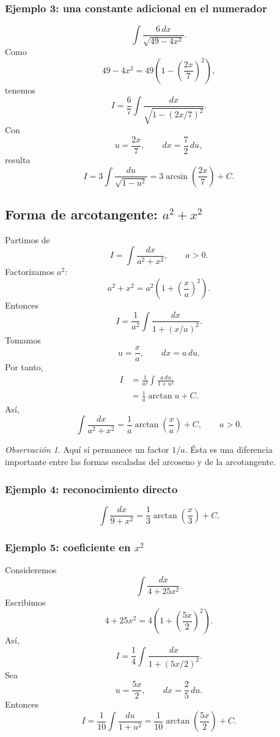 \documentclass[12pt]{article}
\theoremstyle{definition}
\theoremstyle{remark}
\newtheorem*{observacion}{Observación}
\begin{document}
\subsubsection*{Ejemplo 3: una constante adicional en el numerador}
\[
\int\frac{6\,dx}{\sqrt{49-4x^2}}.
\]
Como
\[
49-4x^2=49\left(1-\left(\frac{2x}{7}\right)^2\right),
\]
tenemos
\[
I=\frac67\int\frac{dx}{\sqrt{1-(2x/7)^2}}.
\]
Con
\[
u=\frac{2x}{7},\qquad dx=\frac72\,du,
\]
resulta
\[
I=3\int\frac{du}{\sqrt{1-u^2}}
=\boxed{3\arcsin\left(\frac{2x}{7}\right)+C}.
\]

\subsection{Forma de arcotangente: \texorpdfstring{$a^2+x^2$}{a2+x2}}

Partimos de
\[
I=\int\frac{dx}{a^2+x^2},\qquad a>0.
\]
Factorizamos $a^2$:
\[
a^2+x^2=a^2\left(1+\left(\frac{x}{a}\right)^2\right).
\]
Entonces
\[
I=\frac1{a^2}\int
\frac{dx}{1+(x/a)^2}.
\]
Tomamos
\[
u=\frac{x}{a},\qquad dx=a\,du.
\]
Por tanto,
\begin{align*}
I
&=\frac1{a^2}\int\frac{a\,du}{1+u^2}\\
&=\frac1a\arctan u+C.
\end{align*}
Así,
\[
\boxed{\int\frac{dx}{a^2+x^2}
=\frac1a\arctan\left(\frac{x}{a}\right)+C,\qquad a>0.}
\]

\begin{observacion}
Aquí sí permanece un factor $1/a$. Ésta es una diferencia importante entre
las formas escaladas del arcoseno y de la arcotangente.
\end{observacion}

\subsubsection*{Ejemplo 4: reconocimiento directo}
\[
\int\frac{dx}{9+x^2}
=\boxed{\frac13\arctan\left(\frac{x}{3}\right)+C}.
\]

\subsubsection*{Ejemplo 5: coeficiente en \texorpdfstring{$x^2$}{x2}}
Consideremos
\[
\int\frac{dx}{4+25x^2}.
\]
Escribimos
\[
4+25x^2=4\left(1+\left(\frac{5x}{2}\right)^2\right).
\]
Así,
\[
I=\frac14\int\frac{dx}{1+(5x/2)^2}.
\]
Sea
\[
u=\frac{5x}{2},\qquad dx=\frac25\,du.
\]
Entonces
\[
I=\frac1{10}\int\frac{du}{1+u^2}
=\boxed{\frac1{10}\arctan\left(\frac{5x}{2}\right)+C}.
\]
\end{document}

